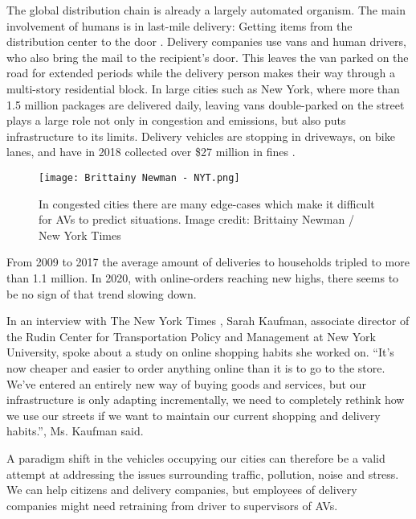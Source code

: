 \documentclass[12pt, usenames, dvipsnames]{report}
\begin{document}
\begin{flushleft}
The global distribution chain is already a largely automated organism. 
The main involvement of humans is in last-mile delivery:
Getting items from the distribution center to the door \cite{mckinsey2016}.
Delivery companies use vans and human drivers, who also bring the mail to the recipient's door.
This leaves the van parked on the road for extended periods while the delivery person makes their way through a multi-story residential block.
In large cities such as New York, where more than 1.5 million packages are delivered daily, leaving vans double-parked on the street plays a large role not only in congestion and emissions, but also puts infrastructure to its limits.
Delivery vehicles are stopping in driveways, on bike lanes, and have in 2018 collected over \$27 million in fines \cite{haag2019}.

\vspace*{1.2em}
\begin{figure}[!htbp]
  \hspace*{5em}
  \texttt{[image: Brittainy Newman - NYT.png]}
  \caption{In congested cities there are many edge-cases which make it difficult for AVs to predict situations. Image credit: Brittainy Newman / New York Times}
  \label{fig:newmannyt}
\end{figure}
\vspace*{1.2em}

From 2009 to 2017 the average amount of deliveries to households tripled to more than 1.1 million.
In 2020, with online-orders reaching new highs, there seems to be no sign of that trend slowing down.

In an interview with The New York Times \cite{haag2019}, Sarah Kaufman, associate director of the Rudin Center for Transportation Policy and Management at New York University, spoke about a study on online shopping habits she worked on.
“It’s now cheaper and easier to order anything online than it is to go to the store.
We’ve entered an entirely new way of buying goods and services, but our infrastructure is only adapting incrementally, we need to completely rethink how we use our streets if we want to maintain our current shopping and delivery habits.”, Ms. Kaufman said.

A paradigm shift in the vehicles occupying our cities can therefore be a valid attempt at addressing the issues surrounding traffic, pollution, noise and stress.
We can help citizens and delivery companies, but employees of delivery companies might need retraining from driver to supervisors of AVs.


\end{flushleft}
\end{document}
